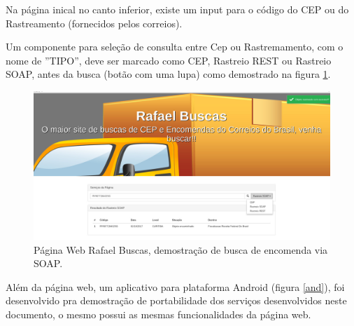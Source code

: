 \documentclass[12pt]{article}
\begin{document}
	  	Na página inical no canto inferior, existe um input para o código do CEP ou do Rastreamento (fornecidos pelos correios).
	  	
	  	Um componente para seleção de consulta entre Cep ou Rastremamento, com o nome de ''TIPO'', deve ser marcado como CEP, Rastreio REST ou Rastreio SOAP, antes da busca (botão com uma lupa) como demostrado na figura \ref{c2}.
	  	
	  	\begin{figure}[H]
	  		\centering
	  		\includegraphics[scale=0.23]{Imagens/c2.jpg}
	  		\caption{Página Web Rafael Buscas, demostração de busca de encomenda via SOAP.}
	  		\label{c2}
	  	\end{figure}	
  	
  	Além da página web, um aplicativo para plataforma Android (figura \ref{and}), foi desenvolvido pra demostração de portabilidade dos serviços desenvolvidos neste documento, o mesmo possui as mesmas funcionalidades da página web.
  	
\end{document}
